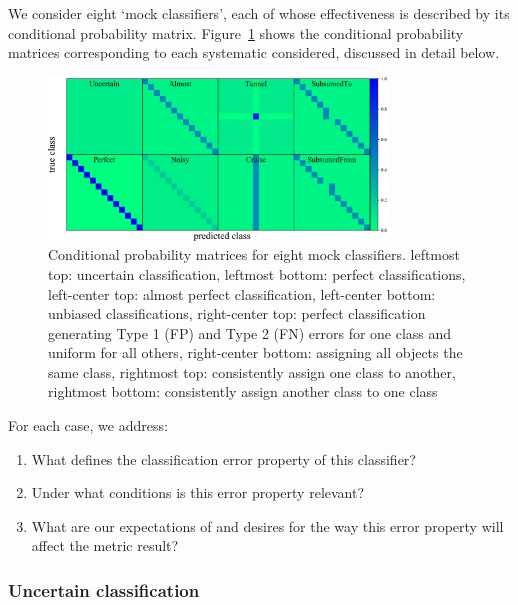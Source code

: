 We consider eight `mock classifiers', each of whose effectiveness is described by its conditional probability matrix. Figure~\ref{fig:mock_cm} shows the conditional probability matrices corresponding to each systematic considered, discussed in detail below.
\begin{figure}
	\begin{center}
    \includegraphics[width=0.8\textwidth]{./fig/all_sim_cm.png}
		\caption{Conditional probability matrices for eight mock classifiers.
    leftmost top: uncertain classification,
    leftmost bottom: perfect classifications,
    left-center top: almost perfect classification,
    left-center bottom: unbiased classifications,
    right-center top: perfect classification generating Type 1 (FP) and Type 2 (FN) errors for one class and uniform for all others,
    right-center bottom: assigning all objects the same class,
    rightmost top: consistently assign one class to another,
    rightmost bottom: consistently assign another class to one class}
		\label{fig:mock_cm}
	\end{center}
\end{figure}

For each case, we address:
\begin{enumerate}
  \item What defines the classification error property of this classifier?
  \item Under what conditions is this error property relevant?
  \item What are our expectations of and desires for the way this error property will affect the metric result?
\end{enumerate}

\subsubsection{Uncertain classification}
\label{sec:uncertaindata}

